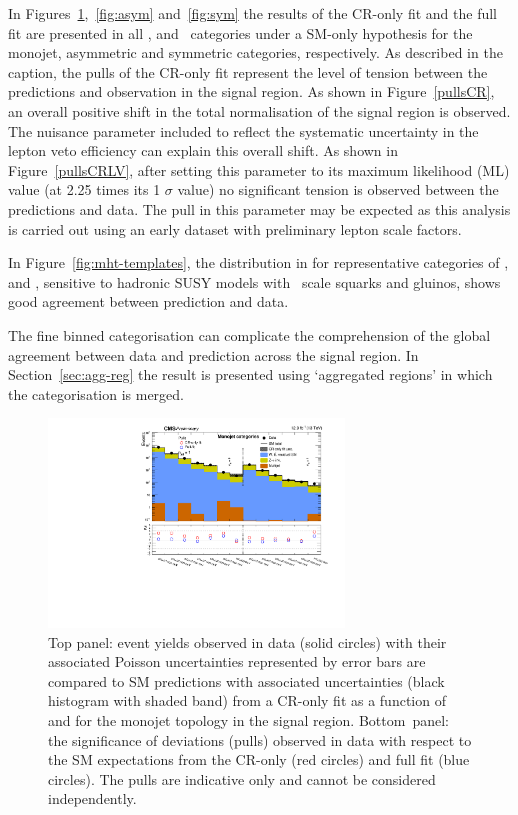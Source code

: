 In Figures~\ref{fig:mono},~\ref{fig:asym} and~\ref{fig:sym} the results of the CR-only fit and the full fit are presented in all \scalht, \njet 
and \nb~categories under a SM-only hypothesis for the monojet, asymmetric 
and symmetric categories, respectively. As described in the caption, the pulls of the CR-only fit represent the level of tension 
between the predictions and observation in the signal region. As shown in Figure~\ref{pullsCR}, an overall positive shift in the
total normalisation of the signal region is observed. The nuisance parameter
included to reflect the systematic uncertainty in the lepton veto efficiency can explain
this overall shift. As shown in Figure~\ref{pullsCRLV}, after setting this parameter to its maximum likelihood (ML) value 
(at 2.25 times its 1 $\sigma$ value) no significant tension is observed between the predictions and data. 
The pull in this parameter may be expected as this analysis is carried out using an early dataset with preliminary 
lepton scale factors.

In Figure~\ref{fig:mht-templates}, the distribution in \mht for representative 
categories of \scalht, \njet and \nb, sensitive to hadronic SUSY models with \TeV~scale squarks and gluinos, 
shows good agreement between prediction and data.

The fine binned categorisation can complicate the comprehension of the global agreement between data and 
prediction across the signal region. In Section~\ref{sec:agg-reg} the result is presented using 
`aggregated regions' in which the categorisation is merged. 

\begin{figure}[!h]
  \begin{center}
    \includegraphics[width=0.7\textwidth]{Figures/statisticalResults/summaryPlot_Monojet_prefit_overlay_fit_b}
    \caption{Top panel: event yields observed in data (solid circles) 
	with their associated Poisson uncertainties represented by error bars 
	are compared to SM predictions with associated uncertainties (black
      histogram with shaded band) from a CR-only fit as a function of
      \nb~ and \scalht for the monojet topology in the
      signal region. Bottom~panel: the significance of deviations
      (pulls) observed in data with respect to the SM expectations
      from the CR-only (red circles) and full fit (blue circles). The
      pulls are indicative only and cannot be considered
      independently.}
    \label{fig:mono}
  \end{center}
\end{figure}

